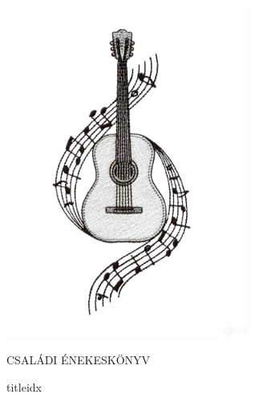 \documentclass[letterpaper]{article}
\begin{document}
\begin{center}
\includegraphics[width=0.6\textwidth]{guitar}
\end{center}

\begin{center}
{\fontsize{60}{60}\selectfont CSALÁDI ÉNEKESKÖNYV}
\end{center}


\newpage

\begin{songs}{titleidx}

\end{songs}
\end{document}
